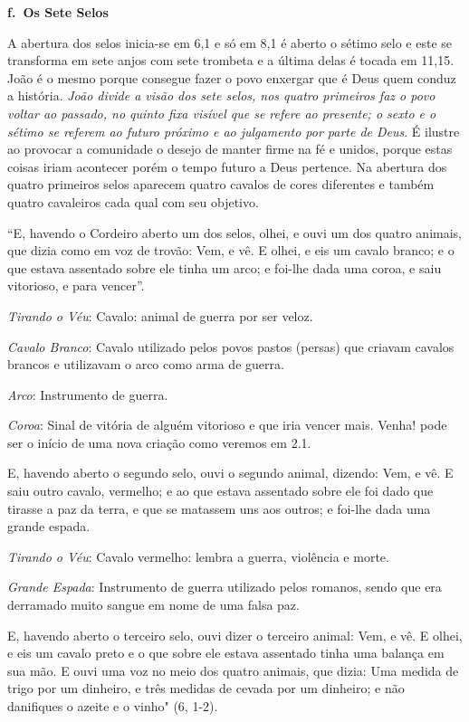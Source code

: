 \documentclass[
]{book}
\begin{document}
\textbf{f.~Os Sete Selos}

A abertura dos selos inicia-se em 6,1 e só em 8,1 é aberto o sétimo selo e este se transforma em sete anjos com sete trombeta e a última delas é tocada em 11,15. João é o mesmo porque consegue fazer o povo enxergar que é Deus quem conduz a história. \emph{João divide a visão dos sete selos, nos quatro primeiros faz o povo voltar ao passado, no quinto fixa visível que se refere ao presente; o sexto e o sétimo se referem ao futuro próximo e ao julgamento por parte de Deus}. É ilustre ao provocar a comunidade o desejo de manter firme na fé e unidos, porque estas coisas iriam acontecer porém o tempo futuro a Deus pertence. Na abertura dos quatro primeiros selos aparecem quatro cavalos de cores diferentes e também quatro cavaleiros cada qual com seu objetivo.

``E, havendo o Cordeiro aberto um dos selos, olhei, e ouvi um dos quatro animais, que dizia como em voz de trovão: Vem, e vê. E olhei, e eis um cavalo branco; e o que estava assentado sobre ele tinha um arco; e foi-lhe dada uma coroa, e saiu vitorioso, e para vencer''.

\emph{Tirando o Véu}: Cavalo: animal de guerra por ser veloz.

\emph{Cavalo Branco}: Cavalo utilizado pelos povos pastos (persas) que criavam cavalos brancos e utilizavam o arco como arma de guerra.

\emph{Arco}: Instrumento de guerra.

\emph{Coroa}: Sinal de vitória de alguém vitorioso e que iria vencer mais. Venha! pode ser o início de uma nova criação como veremos em 2.1.

E, havendo aberto o segundo selo, ouvi o segundo animal, dizendo: Vem, e vê. E saiu outro cavalo, vermelho; e ao que estava assentado sobre ele foi dado que tirasse a paz da terra, e que se matassem uns aos outros; e foi-lhe dada uma grande espada.

\emph{Tirando o Véu}: Cavalo vermelho: lembra a guerra, violência e morte.

\emph{Grande Espada}: Instrumento de guerra utilizado pelos romanos, sendo que era derramado muito sangue em nome de uma falsa paz.

E, havendo aberto o terceiro selo, ouvi dizer o terceiro animal: Vem, e vê. E olhei, e eis um cavalo preto e o que sobre ele estava assentado tinha uma balança em sua mão. E ouvi uma voz no meio dos quatro animais, que dizia: Uma medida de trigo por um dinheiro, e três medidas de cevada por um dinheiro; e não danifiques o azeite e o vinho" (6, 1-2).
\end{document}
